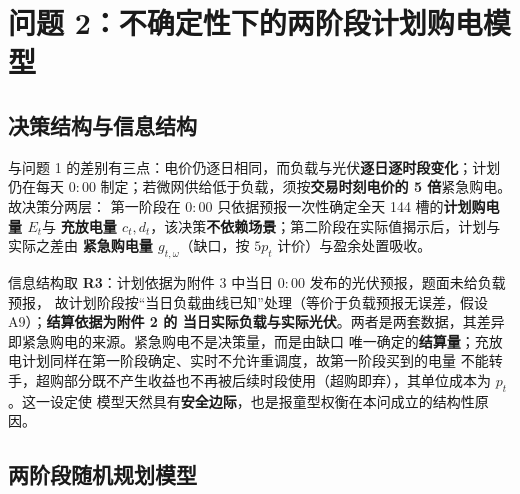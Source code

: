 
\section{问题 2：不确定性下的两阶段计划购电模型}\label{chap:q2}

\subsection{决策结构与信息结构}\label{sec:q2-struct}

与问题 1 的差别有三点：电价仍逐日相同，而负载与光伏\textbf{逐日逐时段变化}；计划仍在每天
\(0{:}00\) 制定；若微网供给低于负载，须按\textbf{交易时刻电价的 5 倍}紧急购电。故决策分两层：
第一阶段在 \(0{:}00\) 只依据预报一次性确定全天 144 槽的\textbf{计划购电量 \(E_t\)}与
\textbf{充放电量 \(c_t,d_t\)}，该决策\textbf{不依赖场景}；第二阶段在实际值揭示后，计划与实际之差由
\textbf{紧急购电量 \(g_{t,\omega}\)}（缺口，按 \(5p_t\) 计价）与盈余处置吸收。

信息结构取 \textbf{R3}：计划依据为附件 3 中当日 \(0{:}00\) 发布的光伏预报，题面未给负载预报，
故计划阶段按“当日负载曲线已知”处理（等价于负载预报无误差，假设 A9）；\textbf{结算依据为附件 2 的
当日实际负载与实际光伏}。两者是两套数据，其差异即紧急购电的来源。紧急购电不是决策量，而是由缺口
唯一确定的\textbf{结算量}；充放电计划同样在第一阶段确定、实时不允许重调度，故第一阶段买到的电量
不能转手，超购部分既不产生收益也不再被后续时段使用（超购即弃），其单位成本为 \(p_t\)。这一设定使
模型天然具有\textbf{安全边际}，也是报童型权衡在本问成立的结构性原因。

\subsection{两阶段随机规划模型}\label{sec:q2-model}

